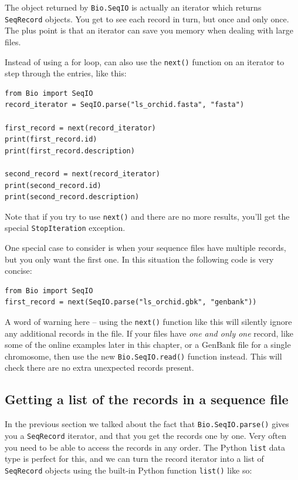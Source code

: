 \documentclass{report}
\begin{document}
The object returned by \verb|Bio.SeqIO| is actually an iterator which returns \verb|SeqRecord| objects.  You get to see each record in turn, but once and only once.  The plus point is that an iterator can save you memory when dealing with large files.

Instead of using a for loop, can also use the \verb|next()| function on an iterator to step through the entries, like this:

\begin{verbatim}
from Bio import SeqIO
record_iterator = SeqIO.parse("ls_orchid.fasta", "fasta")

first_record = next(record_iterator)
print(first_record.id)
print(first_record.description)

second_record = next(record_iterator)
print(second_record.id)
print(second_record.description)
\end{verbatim}

Note that if you try to use \verb|next()| and there are no more results, you'll get the special \verb|StopIteration| exception.

One special case to consider is when your sequence files have multiple records, but you only want the first one.  In this situation the following code is very concise:

\begin{verbatim}
from Bio import SeqIO
first_record = next(SeqIO.parse("ls_orchid.gbk", "genbank"))
\end{verbatim}

A word of warning here -- using the \verb|next()| function like this will silently ignore any additional records in the file.
If your files have {\it one and only one} record, like some of the online examples later in this chapter, or a GenBank file for a single chromosome, then use the new \verb|Bio.SeqIO.read()| function instead.
This will check there are no extra unexpected records present.

\subsection{Getting a list of the records in a sequence file}

In the previous section we talked about the fact that \verb|Bio.SeqIO.parse()| gives you a \verb|SeqRecord| iterator, and that you get the records one by one.  Very often you need to be able to access the records in any order. The Python \verb|list| data type is perfect for this, and we can turn the record iterator into a list of \verb|SeqRecord| objects using the built-in Python function \verb|list()| like so:
\end{document}
